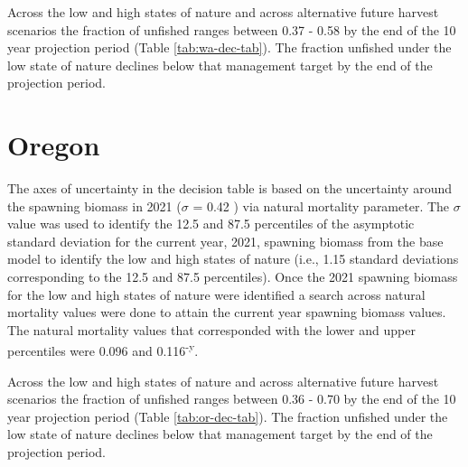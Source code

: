 \documentclass[11pt,
  english,
  a4paper,
]{article}
\begin{document}
\leavevmode\tagmcend\tagstructend\par


Across the low and high states of nature and across alternative future harvest scenarios the fraction of unfished ranges between 0.37 - 0.58 by the end of the 10 year projection period (Table \ref{tab:wa-dec-tab}). The fraction unfished under the low state of nature declines below that management target by the end of the projection period.

\leavevmode\tagmcend\tagstructend\par



\clearpage


\hypertarget{oregon}{%
\section{Oregon}\label{oregon}}

\leavevmode\tagmcend\tagstructend


The axes of uncertainty in the decision table is based on the uncertainty around the spawning biomass in 2021 ({\(\sigma\)\leavevmode\tagmcend\tagstructend} = 0.42 ) via natural mortality parameter. The {\(\sigma\)\leavevmode\tagmcend\tagstructend} value was used to identify the 12.5 and 87.5 percentiles of the asymptotic standard deviation for the current year, 2021, spawning biomass from the base model to identify the low and high states of nature (i.e., 1.15 standard deviations corresponding to the 12.5 and 87.5 percentiles). Once the 2021 spawning biomass for the low and high states of nature were identified a search across natural mortality values were done to attain the current year spawning biomass values. The natural mortality values that corresponded with the lower and upper percentiles were 0.096 and 0.116\textsuperscript{-y}.

\leavevmode\tagmcend\tagstructend\par


Across the low and high states of nature and across alternative future harvest scenarios the fraction of unfished ranges between 0.36 - 0.70 by the end of the 10 year projection period (Table \ref{tab:or-dec-tab}). The fraction unfished under the low state of nature declines below that management target by the end of the projection period.
\end{document}
